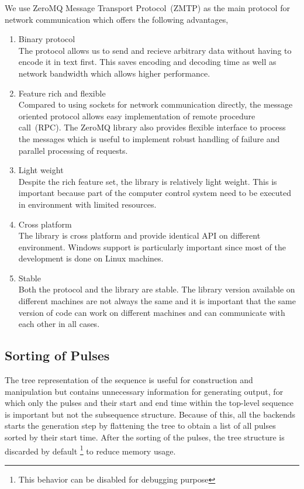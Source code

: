 We use ZeroMQ Message Transport Protocol~(ZMTP) as the main protocol for network communication
which offers the following advantages,
\begin{enumerate}
\item Binary protocol\\
  The protocol allows us to send and recieve arbitrary data without having to encode it
  in text first. This saves encoding and decoding time as well as network bandwidth
  which allows higher performance.
\item Feature rich and flexible\\
  Compared to using sockets for network communication directly,
  the message oriented protocol allows easy implementation of remote procedure call~(RPC).
  The ZeroMQ library also provides flexible interface to process the messages
  which is useful to implement robust handling of failure
  and parallel processing of requests.
\item Light weight\\
  Despite the rich feature set, the library is relatively light weight.
  This is important because part of the computer control system
  need to be executed in environment with limited resources.
\item Cross platform\\
  The library is cross platform and provide identical API on different environment.
  Windows support is particularly important since most of the development is done
  on Linux machines.
\item Stable\\
  Both the protocol and the library are stable.
  The library version available on different machines are not always the same
  and it is important that the same version of code can work on different machines
  and can communicate with each other in all cases.
\end{enumerate}

\subsection{Sorting of Pulses}
\label{ch:computer-control:backend:sort-pulse}
The tree representation of the sequence is useful for construction and manipulation
but contains unnecessary information for generating output,
for which only the pulses and their start and end time
within the top-level sequence is important but not the subsequence structure.
Because of this, all the backends starts the generation step by
flattening the tree to obtain a list of all pulses sorted by their start time.
After the sorting of the pulses, the tree structure is discarded by default
\footnote{This behavior can be disabled for debugging purpose} to reduce memory usage.

